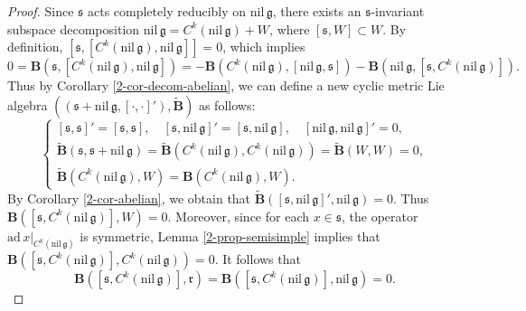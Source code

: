 \documentclass[reqno]{amsart}
\theoremstyle{definition}
\begin{document}
\begin{proof}
Since $\mathfrak{s}$ acts completely reducibly on $\mathrm{nil}\,\mathfrak{g}$, there exists an $\mathfrak{s}$-invariant subspace decomposition $\mathrm{nil}\,\mathfrak{g}=C^{k}(\mathrm{nil}\,\mathfrak{g})+W$, where $[\mathfrak{s},W]\subset W$.  By definition,
 $[\mathfrak{s},[C^{k}(\mathrm{nil}\,\mathfrak{g}),\mathrm{nil}\,\mathfrak{g}]]=0$, which implies
\begin{equation*}
  0=\mathbf{B}\left(\mathfrak{s},[C^{k}(\mathrm{nil}\,\mathfrak{g}),\mathrm{nil}\,\mathfrak{g}]\right)
=-\mathbf{B}\left(C^{k}(\mathrm{nil}\,\mathfrak{g}),[\mathrm{nil}\,\mathfrak{g},\mathfrak{s}]\right)
-\mathbf{B}\left(\mathrm{nil}\,\mathfrak{g},[\mathfrak{s},C^{k}(\mathrm{nil}\,\mathfrak{g})]\right).
\end{equation*}
Thus by  Corollary \ref{2-cor-decom-abelian}, we  can define a new cyclic metric Lie algebra
$\left((\mathfrak{s}+\mathrm{nil}\,\mathfrak{g},[\cdot,\cdot]'),\widetilde{\mathbf{B}}\right)$ as follows:
\begin{equation*}
  \begin{cases}
[\mathfrak{s},\mathfrak{s}]'=[\mathfrak{s},\mathfrak{s}],
\quad [\mathfrak{s},\mathrm{nil}\,\mathfrak{g}]'=[\mathfrak{s},\mathrm{nil}\,\mathfrak{g}],\quad [\mathrm{nil}\,\mathfrak{g},\mathrm{nil}\,\mathfrak{g}]'=0,\\
\widetilde{\mathbf{B}}(\mathfrak{s},\mathfrak{s}+\mathrm{nil}\,\mathfrak{g})
=\widetilde{\mathbf{B}}(C^{k}(\mathrm{nil}\,\mathfrak{g}),C^{k}(\mathrm{nil}\,\mathfrak{g}))
=\widetilde{\mathbf{B}}(W,W)=0,\\
\widetilde{\mathbf{B}}(C^{k}(\mathrm{nil}\,\mathfrak{g}),W)=\mathbf{B}(C^{k}(\mathrm{nil}\,\mathfrak{g}),W).
\end{cases}
\end{equation*}
By Corollary \ref{2-cor-abelian},
we obtain that $\widetilde{\mathbf{B}}([\mathfrak{s},\mathrm{nil}\,\mathfrak{g}]',\mathrm{nil}\,\mathfrak{g})=0$.
Thus $\mathbf{B}([\mathfrak{s},C^{k}(\mathrm{nil}\,\mathfrak{g})],W)=0$.
Moreover, since for each $x\in \mathfrak{s}$, the operator $\mathrm{ad}\,x|_{C^{k}(\mathrm{nil}\,\mathfrak{g})}$ is symmetric,
Lemma \ref{2-prop-semisimple} implies that
 $\mathbf{B}([\mathfrak{s},C^{k}(\mathrm{nil}\,\mathfrak{g})],C^{k}(\mathrm{nil}\,\mathfrak{g}))=0$.
It follows  that
\begin{equation*}
 \mathbf{B}([\mathfrak{s},C^{k}(\mathrm{nil}\,\mathfrak{g})],\mathfrak{r})
=\mathbf{B}([\mathfrak{s},C^{k}(\mathrm{nil}\,\mathfrak{g})],\mathrm{nil}\,\mathfrak{g})=0.
\end{equation*}



\end{proof}
\end{document}
